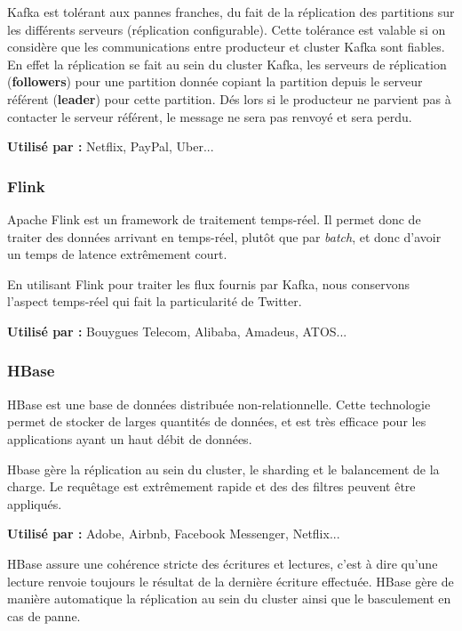 \documentclass[a4paper,oneside,10pt]{article}
\begin{document}
Kafka est tolérant aux pannes franches, du fait de la réplication des partitions sur les différents serveurs (réplication configurable). Cette tolérance est valable si on considère que les communications entre producteur et cluster Kafka sont fiables. En effet la réplication se fait au sein du cluster Kafka, les serveurs de réplication (\textbf{followers}) pour une partition donnée copiant la partition depuis le serveur référent (\textbf{leader}) pour cette partition. Dés lors si le producteur ne parvient pas à contacter le serveur référent, le message ne sera pas renvoyé et sera perdu. 

\textbf{Utilisé par :} Netflix, PayPal, Uber...


\subsubsection{Flink}
Apache Flink est un framework de traitement temps-réel. Il permet donc de traiter des données arrivant en temps-réel, plutôt que par \textit{batch}, et donc d'avoir un temps de latence extr\^emement court.

En utilisant Flink pour traiter les flux fournis par Kafka, nous conservons l'aspect temps-réel qui fait la particularité de Twitter.

\textbf{Utilisé par :} Bouygues Telecom, Alibaba, Amadeus, ATOS...


\subsubsection{HBase}
HBase est une base de données distribuée non-relationnelle. Cette technologie permet de stocker de larges quantités de données, et est très efficace pour les applications ayant un haut débit de données.

Hbase gère la réplication au sein du cluster, le sharding et le balancement de la charge. Le requêtage est extrêmement rapide et des des filtres peuvent être appliqués.

\textbf{Utilisé par :} Adobe, Airbnb, Facebook Messenger, Netflix...

HBase assure une cohérence stricte des écritures et lectures, c'est à dire qu'une lecture renvoie toujours le résultat de la dernière écriture effectuée.
HBase gère de manière automatique la réplication au sein du cluster ainsi que le basculement en cas de panne.
\end{document}
